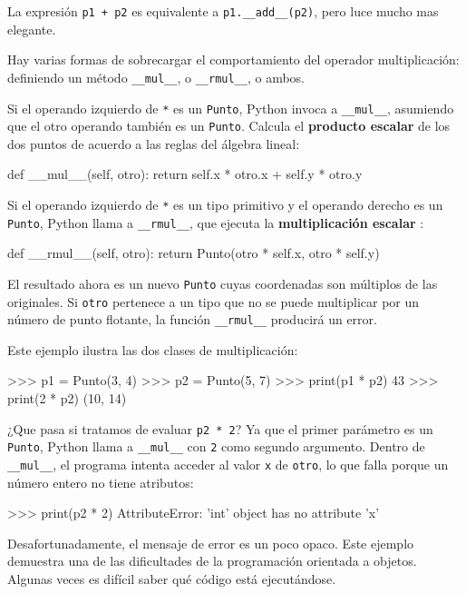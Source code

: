 La expresión \texttt{p1 + p2} es equivalente a \texttt{p1.\_\_add\_\_(p2)},
pero luce mucho mas elegante.

Hay varias formas de sobrecargar el comportamiento del operador multiplicación:
definiendo un método \texttt{\_\_mul\_\_}, o \texttt{\_\_rmul\_\_},
o ambos.

Si el operando izquierdo de \texttt{{*}} es un \texttt{Punto}, Python
invoca a \texttt{\_\_mul\_\_}, asumiendo que el otro operando también
es un \texttt{Punto}. Calcula el \textbf{producto escalar} de los
dos puntos de acuerdo a las reglas del álgebra lineal:
\begin{pythoncode}
def __mul__(self, otro):
  return self.x * otro.x + self.y * otro.y
\end{pythoncode}

Si el operando izquierdo de \texttt{{*}} es un tipo primitivo y el
operando derecho es un \texttt{Punto}, Python llama a \texttt{\_\_rmul\_\_},
que ejecuta la \textbf{multiplicación escalar }:
\begin{pythoncode}
def __rmul__(self, otro):
  return Punto(otro * self.x,  otro * self.y)
\end{pythoncode}

El resultado ahora es un nuevo \texttt{Punto} cuyas coordenadas son
múltiplos de las originales. Si \texttt{otro} pertenece a un tipo
que no se puede multiplicar por un número de punto flotante, la función
\texttt{\_\_rmul\_\_} producirá un error.

Este ejemplo ilustra las dos clases de multiplicación:
\begin{pyconcode}
>>> p1 = Punto(3, 4)
>>> p2 = Punto(5, 7)
>>> print(p1 * p2)
43
>>> print(2 * p2)
(10, 14)
\end{pyconcode}
 ¿Que pasa si tratamos de evaluar \texttt{p2 {*} 2}? Ya que el primer
parámetro es un \texttt{Punto}, Python llama a \texttt{\_\_mul\_\_}
con \texttt{2} como segundo argumento. Dentro de \texttt{\_\_mul\_\_},
el programa intenta acceder al valor \texttt{x} de \texttt{otro},
lo que falla porque un número entero no tiene atributos:

\begin{pythoncode}
>>> print(p2 * 2)
AttributeError: 'int' object has no attribute 'x'
\end{pythoncode}
 Desafortunadamente, el mensaje de error es un poco opaco. Este ejemplo
demuestra una de las dificultades de la programación orientada a objetos.
Algunas veces es difícil saber qué código está ejecutándose.

